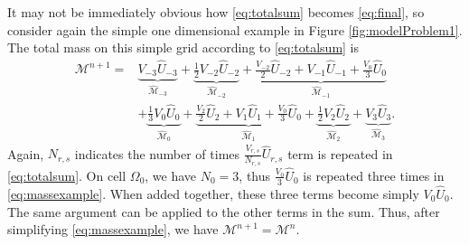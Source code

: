 It may not be immediately obvious how \eqref{eq:totalsum} becomes \eqref{eq:final}, so consider again the simple one dimensional example in Figure \ref{fig:modelProblem1}.  The total mass on this simple grid according to \eqref{eq:totalsum} is
\begin{equation}
\begin{aligned}\label{eq:massexample}
\mathcal{M}^{n+1} = & \underbrace{V_{-3} \widehat U_{-3}}_{\widehat{\mathcal{M}}_{-3}} + \underbrace{\frac{1}{2}V_{-2} \widehat U_{-2} }_{\widehat{\mathcal{M}}_{-2}} + \underbrace{ \frac{V_{-2}}{2}\widehat U_{-2} + V_{-1}\widehat U_{-1} + \frac{V_{0}}{3}\widehat U_{0} }_{\widehat{\mathcal{M}}_{-1}} \\
&+  \underbrace{\frac{1}{3}V_{0} \widehat U_{0}}_{\widehat{\mathcal{M}}_{0}}  + \underbrace{ \frac{V_{2}}{2}\widehat U_{2} + V_{1}\widehat U_{1} + \frac{V_{0}}{3}\widehat U_{0} }_{\widehat{\mathcal{M}}_{1}}  + \underbrace{\frac{1}{2}V_{2} \widehat U_{2} }_{\widehat{\mathcal{M}}_{2}} + \underbrace{V_{3} \widehat U_{3}}_{\widehat{\mathcal{M}}_{3}}.
\end{aligned}
\end{equation}
Again, $N_{r,s}$ indicates the number of times $\frac{V_{r,s}}{N_{r,s}} \widehat U_{r,s}$ term is repeated in \eqref{eq:totalsum}.  On cell $\Omega_0$, we have $N_0=3$, thus $\frac{V_0}{3} \widehat U_0$ is repeated three times in \eqref{eq:massexample}.  When added together, these three terms become simply $V_0 \widehat U_0$.  The same argument can be applied to the other terms in the sum.  Thus, after simplifying \eqref{eq:massexample}, we have $\mathcal{M}^{n+1} = \mathcal{M}^{n}$.




